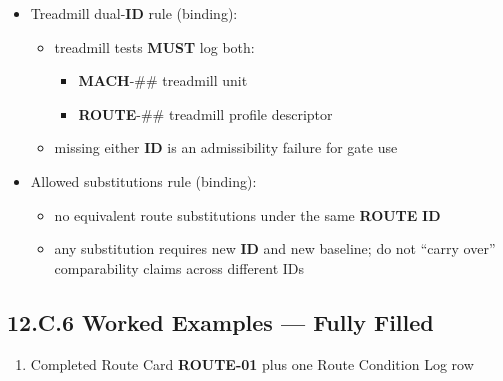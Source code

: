 \documentclass[10pt]{article}
\begin{document}
\begin{landscape}
\begin{itemize}
\begin{itemize}
\end{itemize}
\item Treadmill dual-\textbf{ID} rule (binding):
\begin{itemize}
\item treadmill tests \textbf{MUST} log both:
\begin{itemize}
\item \textbf{MACH}-## treadmill unit
\item \textbf{ROUTE}-## treadmill profile descriptor
\end{itemize}
\item missing either \textbf{ID} is an admissibility failure for gate use
\end{itemize}
\item Allowed substitutions rule (binding):
\begin{itemize}
\item no equivalent route substitutions under the same \textbf{ROUTE} \textbf{ID}
\item any substitution requires new \textbf{ID} and new baseline; do not “carry over” comparability claims across different IDs
\end{itemize}
\end{itemize}

\newpage
\subsection*{12.C.6 Worked Examples — Fully Filled}
{}

\begin{enumerate}
\item Completed Route Card \textbf{ROUTE-01} plus one Route Condition Log row


\end{enumerate}
\end{landscape}
\end{document}
